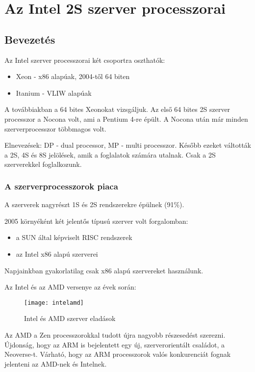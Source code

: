 
\chapter{Az Intel 2S szerver processzorai}

\section{Bevezetés}
Az Intel szerver processzorai két csoportra oszthatók:
\begin{itemize}
    \item Xeon - x86 alapúak, 2004-től 64 biten
    \item Itanium - VLIW alapúak
\end{itemize}

A továbbiakban a 64 bites Xeonokat vizsgáljuk.
Az első 64 bites 2S szerver processzor a Nocona volt, ami a Pentium 4-re épült.
A Nocona után már minden szerverprocesszor többmagos volt.

Elnevezések: DP - dual processor, MP - multi processzor.
Később ezeket váltották a 2S, 4S és 8S jelölések, amik a foglalatok számára utalnak.
Csak a 2S szerverekkel foglalkozunk.

\subsection{A szerverprocesszorok piaca}
A szerverek nagyrészt 1S és 2S rendszerekre épülnek (91\%).

2005 környéként két jelentős típusú szerver volt forgalomban:
\begin{itemize}
    \item a SUN által képviselt RISC rendszerek
    \item az Intel x86 alapú szerverei
\end{itemize}
Napjainkban gyakorlatilag csak x86 alapú szervereket használunk.

Az Intel és az AMD versenye az évek során:
\begin{figure}[H]
    \texttt{[image: intelamd]}
    \centering
    \caption{Intel és AMD szerver eladások}
    \label{fig:intelamd}
\end{figure}
Az AMD a Zen processzorokkal tudott újra nagyobb részesedést szerezni.
Újdonság, hogy az ARM is bejelentett egy új, szerverorientált családot, a Neoverse-t.
Várható, hogy az ARM processzorok valós konkurenciát fognak jelenteni az AMD-nek és Intelnek.

